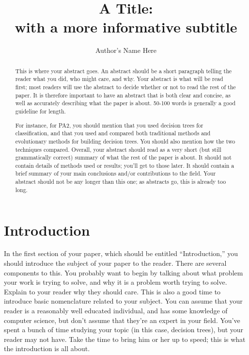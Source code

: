 \documentclass[12pt,letterpaper]{article}
\title{A Title: \\ with a more informative subtitle}
\author{Author's Name Here}
\begin{document}
\maketitle

\begin{abstract}
This is where your abstract goes.  An abstract should be a short paragraph
telling the reader what you did, who might care, and why.  Your abstract is what
will be read first; most readers will use the abstract to decide whether or not
to read the rest of the paper.  It is therefore important to have an abstract
that is both clear and concise, as well as accurately describing what the paper
is about.  50-100 words is generally a good guideline for length.

For instance, for PA2, you should mention that you used decision trees for
classification, and that you used and compared both traditional methods 
and evolutionary methods for building decision trees.  You should also mention
how the two techniques compared.  Overall, your abstract should read as a
very short (but still grammatically correct) summary of what the rest of the
paper is about.  It should not contain details of methods used or results;
you'll get to those later.  It should contain a brief summary of your main
conclusions and/or contributions to the field. Your abstract should not be any
longer than this one; as abstracts go, this is already too long.
\end{abstract}

\section{Introduction}
In the first section of your paper, which should be entitled ``Introduction,''
you should introduce the subject of your paper to the reader.  There are several
components to this.  You probably want to begin by talking about what problem
your work is trying to solve, and why it is a problem worth trying to solve.
Explain to your reader why they should care.  This is also a good time to
introduce basic nomenclature related to your subject.  You can assume that your
reader is a reasonably well educated individual, and has some knowledge of
computer science, but don't assume that they're an expert in your field.  You've
spent a bunch of time studying your topic (in this case, decision trees), but
your reader may not have.  Take the time to bring him or her up to speed; this
is what the introduction is all about.
\end{document}
